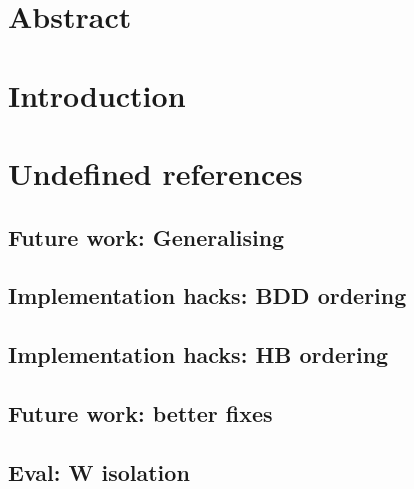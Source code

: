 \documentclass[12pt,a4paper]{report}
\begin{document}


\maketitle
\tableofcontents

\chapter{Abstract}


\chapter{Introduction}














\chapter{Undefined references}
\section{Future work: Generalising}
\label{sect:future_work:generalising}

\section{Implementation hacks: BDD ordering}
\label{sect:implementation_hacks:bdd_ordering}

\section{Implementation hacks: HB ordering}
\label{sect:implementation_hacks:hb_ordering}

\section{Future work: better fixes}
\label{sect:future_work:better_fixes}

\section{Eval: W isolation}
\label{sect:eval:w_isolation}

\printglossaries



\end{document}
